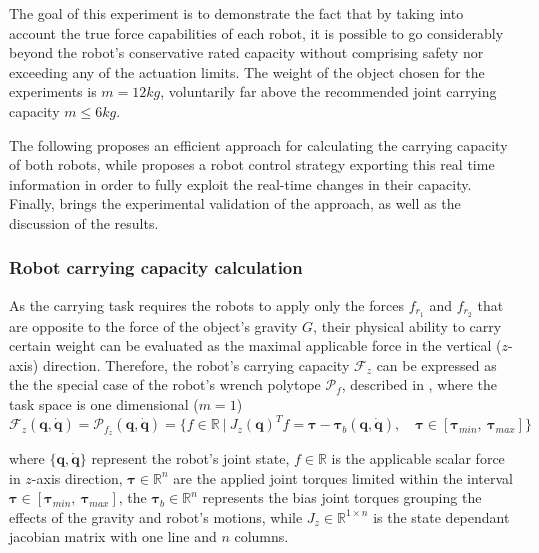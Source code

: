 The goal of this experiment is to demonstrate the fact that by taking into account the true force capabilities of each robot, it is possible to go considerably beyond the robot's conservative rated capacity without comprising safety nor exceeding any of the actuation limits. The weight of the object chosen for the experiments is $m=12kg$, voluntarily far above the recommended joint carrying capacity $ m\le 6kg$. 

The following  proposes an efficient approach for calculating the carrying capacity of both robots, while  proposes a robot control strategy exporting this real time information in order to fully exploit the real-time changes in their capacity. Finally,  brings the experimental validation of the approach, as well as the discussion of the results. 

\subsubsection{Robot carrying capacity calculation}
\label{sec:robot_carrying_capacity}


As the carrying task requires the robots to apply only the forces $f_{r_1}$ and $f_{r_2}$ that are opposite to the force of the object's gravity $G$, their physical ability to carry certain weight can be evaluated as the maximal applicable force in the vertical ($z$-axis) direction. Therefore, the robot's carrying capacity $\mathcal{F}_z$ can be expressed as the the special case of the robot's wrench polytope $\mathcal{P}_{f}$, described in , where the task space is one dimensional ($m=1$)
\begin{equation}
    \mathcal{F}_z (\bm{q},\dot{\bm{q}}) = \mathcal{P}_{f_z} (\bm{q},\dot{\bm{q}}) = \{ f \in \mathbb{R} ~|~ J_{z}(\bm{q})^Tf=\bm{\tau} - \bm{\tau}_b(\bm{q},\dot{\bm{q}}), \quad \bm{\tau}\in[\bm{\tau}_{min}, ~\bm{\tau}_{max}]\}
\end{equation}

where $\{\bm{q},\dot{\bm{q}}\}$ represent the robot's joint state, $f \in\mathbb{R}$ is the applicable scalar force in $z$-axis direction, $\bm{\tau}\in\mathbb{R}^n$ are the applied joint torques limited within the interval $\bm{\tau}\in[\bm{\tau}_{min}, ~\bm{\tau}_{max}]$, the $\bm{\tau}_{b}\in\mathbb{R}^n$ represents the bias joint torques grouping the effects of the gravity and robot's motions, while $J_{z}\in\mathbb{R}^{1\times n}$ is the state dependant jacobian matrix with one line and $n$ columns.

